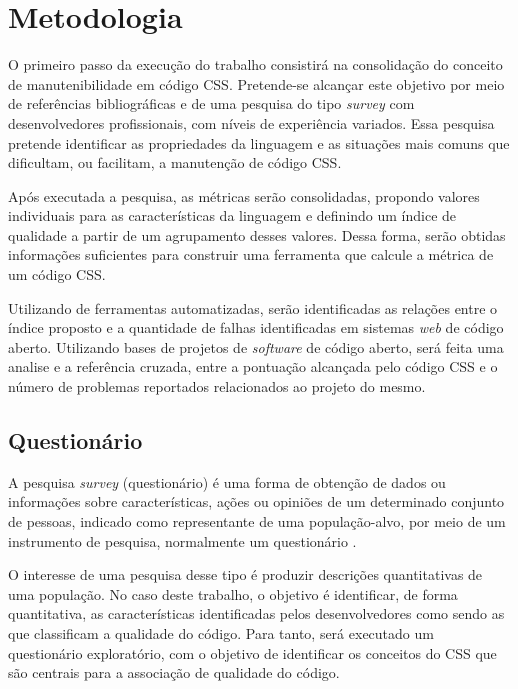 %
%

\chapter{Metodologia}

O primeiro passo da execução do trabalho consistirá na consolidação do conceito de manutenibilidade em código CSS. Pretende-se alcançar este objetivo por meio de referências bibliográficas e de uma pesquisa do tipo \textit{survey} com desenvolvedores profissionais, com níveis de experiência variados. Essa pesquisa pretende identificar as propriedades da linguagem e as situações mais comuns que dificultam, ou facilitam, a manutenção de código CSS.

Após executada a pesquisa, as métricas serão consolidadas, propondo valores individuais para as características da linguagem e definindo um índice de qualidade a partir de um agrupamento desses valores. Dessa forma, serão obtidas informações suficientes para construir uma ferramenta que calcule a métrica de um código CSS.

Utilizando de ferramentas automatizadas, serão identificadas as relações entre o índice proposto e a quantidade de falhas identificadas em sistemas \textit{web} de código aberto. Utilizando bases de projetos de \textit{software} de código aberto, será feita uma analise e a referência cruzada, entre a pontuação alcançada pelo código CSS e o número de problemas reportados relacionados ao projeto do mesmo.

\section{Questionário}

A pesquisa \textit{survey} (questionário) é uma forma de obtenção de dados ou informações sobre características, ações ou opiniões de um determinado conjunto de pessoas, indicado como representante de uma população-alvo, por meio de um instrumento de pesquisa, normalmente um questionário \cite{Freitas2000}. 

O interesse de uma pesquisa desse tipo é produzir descrições quantitativas de uma população. No caso deste trabalho, o objetivo é identificar, de forma quantitativa, as características identificadas pelos desenvolvedores como sendo as que classificam a qualidade do código. Para tanto, será executado um questionário exploratório, com o objetivo de identificar os conceitos do CSS que são centrais para a associação de qualidade do código.

